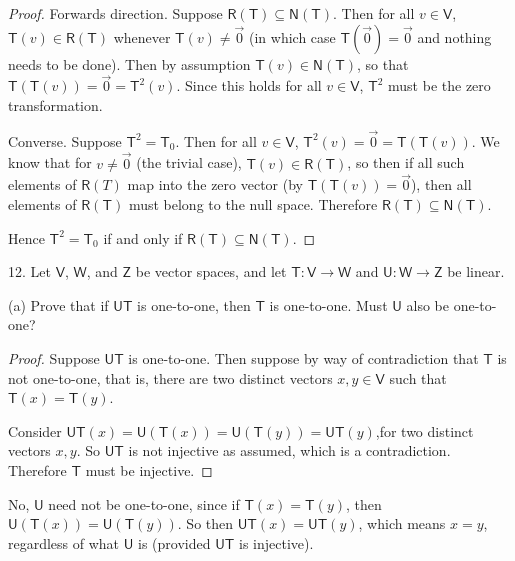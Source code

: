 \documentclass[11pt]{article}
\begin{document}
\begin{proof}
    Forwards direction. Suppose $\mathsf{R(T)} \subseteq \mathsf{N(T)}$. Then for all $v\in\mathsf{V}$, $\mathsf{T}(v) \in \mathsf{R(T)}$ whenever $\mathsf{T}(v) \neq \vec{0}$ (in which case $\mathsf{T}(\vec{0}) = \vec{0}$ and nothing needs to be done). Then by assumption $\mathsf{T}(v)\in\mathsf{N(T)}$, so that $\mathsf{T}(\mathsf{T}(v)) = \vec{0} = \mathsf{T}^2(v)$. Since this holds for all $v\in\mathsf{V}$, $\mathsf{T}^2$ must be the zero transformation.

    Converse. Suppose $\mathsf{T}^2 = \mathsf{T}_0$. Then for all $v\in\mathsf{V}$, $\mathsf{T}^2(v) = \vec{0} = \mathsf{T}(\mathsf{T}(v))$. We know that for $v\neq \vec{0}$ (the trivial case), $\mathsf{T}(v)\in\mathsf{R(T)}$, so then if all such elements of $\mathsf{R}(T)$ map into the zero vector (by $\mathsf{T}(\mathsf{T}(v)) = \vec{0}$), then all elements of $\mathsf{R(T)}$ must belong to the null space. Therefore $\mathsf{R(T)}\subseteq \mathsf{N(T)}$.

    Hence $\mathsf{T}^2 = \mathsf{T}_0$ if and only if $\mathsf{R(T)} \subseteq \mathsf{N(T)}$.
\end{proof}

12. Let $\mathsf{V}$, $\mathsf{W}$, and $\mathsf{Z}$ be vector spaces, and let $\mathsf{T} : \mathsf{V}\to \mathsf{W}$ and $\mathsf{U} : \mathsf{W} \to \mathsf{Z}$ be linear.

(a) Prove that if $\mathsf{UT}$ is one-to-one, then $\mathsf{T}$ is one-to-one. Must $\mathsf{U}$ also be one-to-one?

\begin{proof}
    Suppose $\mathsf{UT}$ is one-to-one. Then suppose by way of contradiction that $\mathsf{T}$ is not one-to-one, that is, there are two distinct vectors $x,y\in\mathsf{V}$ such that $\mathsf{T}(x) = \mathsf{T}(y)$.
    
    Consider $\mathsf{UT}(x) = \mathsf{U}(\mathsf{T}(x)) = \mathsf{U}(\mathsf{T}(y)) = \mathsf{UT}(y)$,for two distinct vectors $x,y$. So $\mathsf{UT}$ is not injective as assumed, which is a contradiction. Therefore $\mathsf{T}$ must be injective.
\end{proof}

No, $\mathsf{U}$ need not be one-to-one, since if $\mathsf{T}(x) = \mathsf{T}(y)$, then $\mathsf{U}(\mathsf{T}(x)) = \mathsf{U}(\mathsf{T}(y))$. So then $\mathsf{UT}(x) = \mathsf{UT}(y)$, which means $x=y$, regardless of what $\mathsf{U}$ is (provided $\mathsf{UT}$ is injective).
\end{document}
